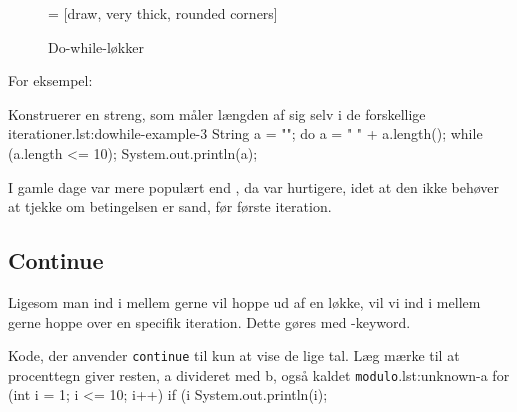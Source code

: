         \begin{figure}
        \center
         = [draw, very thick, rounded corners]
        \caption{Do-while-løkker}
        \label{fig:do-while-loop-illustrated}
        \end{figure}

		For eksempel:

		\begin{JavaCode}{Konstruerer en streng, som måler længden af sig selv i de forskellige iterationer.}{lst:dowhile-example-3}
			String a = "";
			do {
				a = " " + a.length();
			} while (a.length <= 10);
			System.out.println(a);
		\end{JavaCode}

        I gamle dage var  mere populært end
        , da  var
        hurtigere, idet at den ikke behøver at tjekke om betingelsen er
        sand, før første iteration.

	\subsection{Continue}

        Ligesom man ind i mellem gerne vil hoppe ud af en løkke, vil
        vi ind i mellem gerne hoppe over en specifik iteration. Dette
        gøres med -keyword.

        \begin{JavaCode}{Kode, der anvender \texttt{continue} til kun at vise de lige tal. Læg mærke til at procenttegn giver resten, a divideret med b, også kaldet \texttt{modulo}.}{lst:unknown-a}
			for (int i = 1; i <= 10; i++) {
				if (i %
				System.out.println(i);
			}
		\end{JavaCode}

